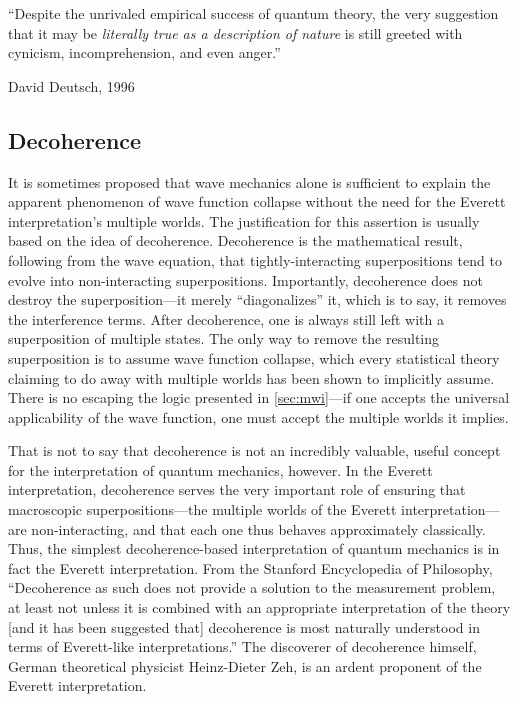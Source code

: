 \documentclass[
    12pt,
    letterpaper,
    aps,
    prd,
    longbibliography,
    twocolumn,
    nofootinbib,
    raggedbottom,
    amsmath,
    amssymb,
    amsfonts,
]{revtex4-1}
\begin{document}
\epigraph{``Despite the unrivaled empirical success of quantum theory, the very suggestion that it may be \textit{literally true as a description of nature} is still greeted with cynicism, incomprehension, and even anger.''\cite{everetttaboo}}{David Deutsch, 1996}

\subsection{Decoherence}

It is sometimes proposed that wave mechanics alone is sufficient to explain the apparent phenomenon of wave function collapse without the need for the Everett interpretation's multiple worlds. The justification for this assertion is usually based on the idea of decoherence. Decoherence is the mathematical result, following from the wave equation, that tightly-interacting superpositions tend to evolve into non-interacting superpositions.\cite{zurek}\cite{decoherence} Importantly, decoherence does not destroy the superposition---it merely ``diagonalizes'' it, which is to say, it removes the interference terms.\cite{zurek} After decoherence, one is always still left with a superposition of multiple states.\cite{stanford}\cite{wallacedecoherence} The only way to remove the resulting superposition is to assume wave function collapse, which every statistical theory claiming to do away with multiple worlds has been shown to implicitly assume.\cite{zehdecoherence}\cite{bornproof3} There is no escaping the logic presented in \autoref{sec:mwi}---if one accepts the universal applicability of the wave function, one must accept the multiple worlds it implies.

That is not to say that decoherence is not an incredibly valuable, useful concept for the interpretation of quantum mechanics, however. In the Everett interpretation, decoherence serves the very important role of ensuring that macroscopic superpositions---the multiple worlds of the Everett interpretation---are non-interacting, and that each one thus behaves approximately classically.\cite{zehdecoherence}\cite{wallacedecoherence} Thus, the simplest decoherence-based interpretation of quantum mechanics is in fact the Everett interpretation. From the Stanford Encyclopedia of Philosophy, ``Decoherence as such does not provide a solution to the measurement problem, at least not unless it is combined with an appropriate interpretation of the theory [and it has been suggested that] decoherence is most naturally understood in terms of Everett-like interpretations.''\cite{stanford} The discoverer of decoherence himself, German theoretical physicist Heinz-Dieter Zeh, is an ardent proponent of the Everett interpretation.\cite{zehbohm}\cite{arrowoftime}
\end{document}
